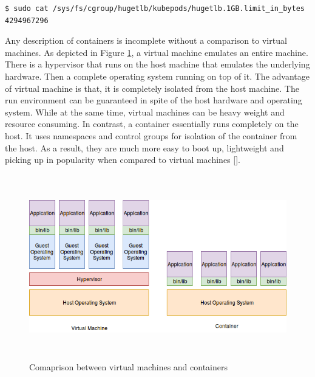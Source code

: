 \documentclass[english, 12pt, a4paper, elec, utf8, a-1b, online]{aaltothesis}
\begin{document}
\begin{lstlisting}[basicstyle={\small\ttfamily}]
$ sudo cat /sys/fs/cgroup/hugetlb/kubepods/hugetlb.1GB.limit_in_bytes 
4294967296

\end{lstlisting}

Any description of containers is incomplete without a comparison to virtual machines. As depicted in Figure \ref{fig-vm-container}, a virtual machine emulates an entire machine. There is a hypervisor that runs on the host machine that emulates the underlying hardware. Then a complete operating system running on top of it. The advantage of virtual machine is that, it is completely isolated from the host machine. The run environment can be guaranteed in spite of the host hardware and operating system. While at the same time, virtual machines can be heavy weight and resource consuming. In contrast, a container essentially runs completely on the host. It uses namespaces and control groups for isolation of the container from the host. As a result, they are much more easy to boot up, lightweight and picking up in popularity when compared to virtual machines [].

\begin{figure}[htb]
\begin{center}
\includegraphics[height=8cm,width=15cm]{pics/Container-vm-comparison.png}
\end{center}
\caption{Comaprison between virtual machines and containers}
\label{fig-vm-container}
\end{figure}
\end{document}
